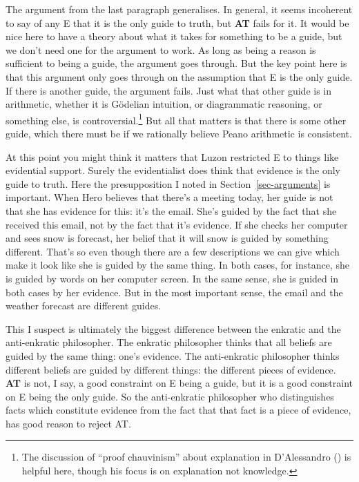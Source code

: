 \documentclass[
  11pt,
  letterpaper,
  DIV=11,
  numbers=noendperiod,
  twoside]{scrartcl}
\begin{document}
The argument from the last paragraph generalises. In general, it seems
incoherent to say of any E that it is the only guide to truth, but
\textbf{AT} fails for it. It would be nice here to have a theory about
what it takes for something to be a guide, but we don't need one for the
argument to work. As long as being a reason is sufficient to being a
guide, the argument goes through. But the key point here is that this
argument only goes through on the assumption that E is the only guide.
If there is another guide, the argument fails. Just what that other
guide is in arithmetic, whether it is Gödelian intuition, or
diagrammatic reasoning, or something else, is controversial.\footnote{The
  discussion of ``proof chauvinism'' about explanation in D'Alessandro
  () is helpful here, though his
  focus is on explanation not knowledge.} But all that matters is that
there is some other guide, which there must be if we rationally believe
Peano arithmetic is consistent.

At this point you might think it matters that Luzon restricted E to
things like evidential support. Surely the evidentialist does think that
evidence is the only guide to truth. Here the presupposition I noted in
Section~\ref{sec-arguments} is important. When Hero believes that
there's a meeting today, her guide is not that she has evidence for
this: it's the email. She's guided by the fact that she received this
email, not by the fact that it's evidence. If she checks her computer
and sees snow is forecast, her belief that it will snow is guided by
something different. That's so even though there are a few descriptions
we can give which make it look like she is guided by the same thing. In
both cases, for instance, she is guided by words on her computer screen.
In the same sense, she is guided in both cases by her evidence. But in
the most important sense, the email and the weather forecast are
different guides.

This I suspect is ultimately the biggest difference between the enkratic
and the anti-enkratic philosopher. The enkratic philosopher thinks that
all beliefs are guided by the same thing: one's evidence. The
anti-enkratic philosopher thinks different beliefs are guided by
different things: the different pieces of evidence. \textbf{AT} is not,
I say, a good constraint on E being a guide, but it is a good constraint
on E being the only guide. So the anti-enkratic philosopher who
distinguishes facts which constitute evidence from the fact that that
fact is a piece of evidence, has good reason to reject AT.
\end{document}
